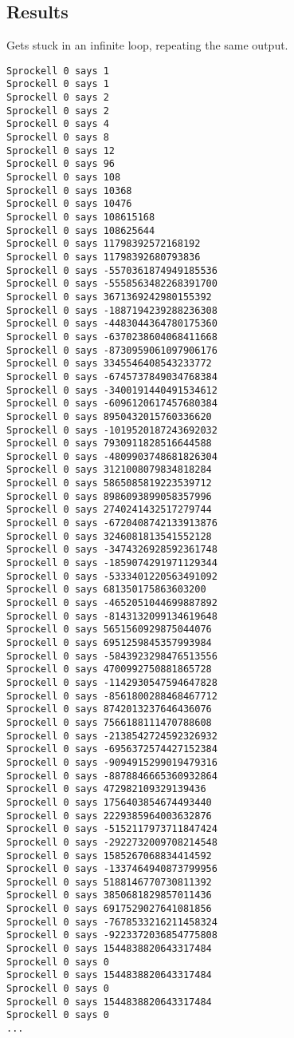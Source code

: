 \documentclass[twoside]{report}
\begin{document}
\subsection{Results}
Gets stuck in an infinite loop, repeating the same output.
\begin{verbatim}
Sprockell 0 says 1
Sprockell 0 says 1
Sprockell 0 says 2
Sprockell 0 says 2
Sprockell 0 says 4
Sprockell 0 says 8
Sprockell 0 says 12
Sprockell 0 says 96
Sprockell 0 says 108
Sprockell 0 says 10368
Sprockell 0 says 10476
Sprockell 0 says 108615168
Sprockell 0 says 108625644
Sprockell 0 says 11798392572168192
Sprockell 0 says 11798392680793836
Sprockell 0 says -5570361874949185536
Sprockell 0 says -5558563482268391700
Sprockell 0 says 3671369242980155392
Sprockell 0 says -1887194239288236308
Sprockell 0 says -4483044364780175360
Sprockell 0 says -6370238604068411668
Sprockell 0 says -8730959061097906176
Sprockell 0 says 3345546408543233772
Sprockell 0 says -6745737849034768384
Sprockell 0 says -3400191440491534612
Sprockell 0 says -6096120617457680384
Sprockell 0 says 8950432015760336620
Sprockell 0 says -1019520187243692032
Sprockell 0 says 7930911828516644588
Sprockell 0 says -4809903748681826304
Sprockell 0 says 3121008079834818284
Sprockell 0 says 5865085819223539712
Sprockell 0 says 8986093899058357996
Sprockell 0 says 2740241432517279744
Sprockell 0 says -6720408742133913876
Sprockell 0 says 3246081813541552128
Sprockell 0 says -3474326928592361748
Sprockell 0 says -1859074291971129344
Sprockell 0 says -5333401220563491092
Sprockell 0 says 681350175863603200
Sprockell 0 says -4652051044699887892
Sprockell 0 says -8143132099134619648
Sprockell 0 says 5651560929875044076
Sprockell 0 says 6951259845357993984
Sprockell 0 says -5843923298476513556
Sprockell 0 says 4700992750881865728
Sprockell 0 says -1142930547594647828
Sprockell 0 says -8561800288468467712
Sprockell 0 says 8742013237646436076
Sprockell 0 says 7566188111470788608
Sprockell 0 says -2138542724592326932
Sprockell 0 says -6956372574427152384
Sprockell 0 says -9094915299019479316
Sprockell 0 says -8878846665360932864
Sprockell 0 says 472982109329139436
Sprockell 0 says 1756403854674493440
Sprockell 0 says 2229385964003632876
Sprockell 0 says -5152117973711847424
Sprockell 0 says -2922732009708214548
Sprockell 0 says 1585267068834414592
Sprockell 0 says -1337464940873799956
Sprockell 0 says 5188146770730811392
Sprockell 0 says 3850681829857011436
Sprockell 0 says 6917529027641081856
Sprockell 0 says -7678533216211458324
Sprockell 0 says -9223372036854775808
Sprockell 0 says 1544838820643317484
Sprockell 0 says 0
Sprockell 0 says 1544838820643317484
Sprockell 0 says 0
Sprockell 0 says 1544838820643317484
Sprockell 0 says 0
...
\end{verbatim}
\end{document}
